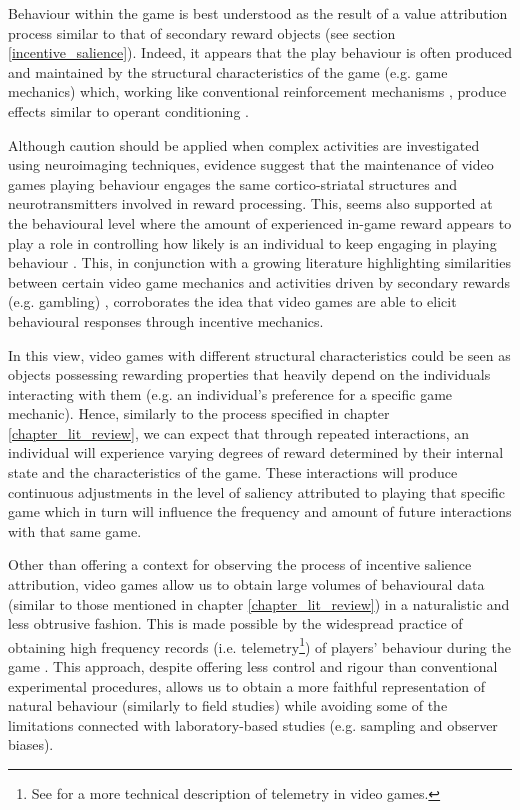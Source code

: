 Behaviour within the game is best understood as the result of a value attribution process similar to that of secondary reward objects (see section \ref{incentive_salience}). Indeed, it appears that the play behaviour is often produced and maintained by the structural characteristics of the game (e.g. game mechanics) \cite{king2010video} which, working like conventional reinforcement mechanisms \cite{chumbley2006affect,wang2011game,phillips2013videogame,avserivskis2017computational}, produce effects similar to operant conditioning \cite{skinner1965science}. 

Although caution should be applied when complex activities are investigated using neuroimaging techniques, evidence suggest that the maintenance of video games playing behaviour engages the same cortico-striatal structures \cite{hoeft2008gender,mathiak2011reward,cole2012interactivity,klasen2012neural,lorenz2015video,gleich2017functional} and neurotransmitters \cite{koepp1998evidence} involved in reward processing. This, seems also supported at the behavioural level where the amount of experienced in-game reward appears to play a role in controlling how likely is an individual to keep engaging in playing behaviour \cite{agarwal2017quitting, steyvers2019joint}. This, in conjunction with a growing literature highlighting similarities between certain video game mechanics and activities driven by secondary rewards (e.g. gambling) \cite{king2010role,drummond2018video,zendle2018video}, corroborates the idea that video games are able to elicit behavioural responses through incentive mechanics. 

In this view, video games with different structural characteristics could be seen as objects possessing rewarding properties that heavily depend on the individuals interacting with them (e.g. an individual's preference for a specific game mechanic). Hence, similarly to the process specified in chapter \ref{chapter_lit_review}, we can expect that through repeated interactions, an individual will experience varying degrees of reward determined by their internal state and the characteristics of the game. These interactions will produce continuous adjustments in the level of saliency attributed to playing that specific game which in turn will influence the frequency and amount of future interactions with that same game. 

Other than offering a context for observing the process of incentive salience attribution, video games allow us to obtain large volumes of behavioural data (similar to those mentioned in chapter \ref{chapter_lit_review}) in a naturalistic and  less obtrusive fashion. This is made possible by the widespread practice of obtaining high frequency records (i.e. telemetry\footnote{See \cite{el2016game} for a more technical description of telemetry in video games.}) of players' behaviour during the game \cite{drachen2015behavioral}. This approach, despite offering less control and rigour than conventional experimental procedures, allows us to obtain a more faithful representation of natural behaviour (similarly to field studies) while avoiding some of the limitations connected with laboratory-based studies (e.g. sampling and observer biases).

